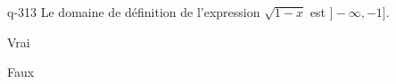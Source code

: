 \begin{truefalse}{q-313}
Le domaine de définition de l'expression $\sqrt{1-x}$ est $]-\infty,-1]$.
\item Vrai
\item* Faux
\end{truefalse}

